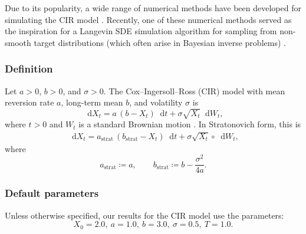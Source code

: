 \documentclass[11pt, letterpaper]{article}
\theoremstyle{definition}
\theoremstyle{remark}
\newcommand{\diff}{\mathop{}\!\mathrm{d}}
\begin{document}
\begin{appendices}
Due to its popularity, a wide range of numerical methods have been developed for simulating the CIR model \cite{alfonsi2005cir, alfonsi2010cir, alfonsi2013cir, cozma2020cir, dereich2011cir, foster2024highSIAM, hefter2019cir, kelly2022cir, lord2010truncation, milstein2015cir, ninomiyavictoir2008}.
Recently, one of these numerical methods \cite{dereich2011cir} served as the inspiration for a Langevin SDE simulation algorithm for sampling from non-smooth target distributions (which often arise in Bayesian inverse problems) \cite{cheltsov2025sampling}.

\subsubsection*{Definition}
Let $a > 0$, $b > 0$, and $\sigma > 0$. The Cox--Ingersoll--Ross (CIR) model with mean reversion rate $a$, long-term mean $b$, and volatility $\sigma$ is
\begin{equation}\label{eq:cir_ito}
    \diff X_t = a\,(b - X_t) \diff t + \sigma \sqrt{X_t} \diff W_t,
\end{equation}
where $t >0$ and $W_t$ is a standard Brownian motion \cite{cox1985cir}.
In Stratonovich form, this is
\begin{align}\label{eq:cir_strat}
\diff X_t = a_\text{strat}\,(b_\text{strat} - X_t) \diff t + \sigma\sqrt{X_{t}} \circ \diff W_t,
\end{align}
where
\begin{equation*}
    a_{\text{strat}} \coloneqq a,\qquad
    b_{\text{strat}} \coloneqq b - \frac{\sigma^2}{4a}.
\end{equation*}

\subsubsection*{Default parameters}
Unless otherwise specified, our results for the CIR model use the parameters:
\[X_{0}=2.0,\ a=1.0,\ b=3.0,\ \sigma=0.5, \ T = 1.0.\]


\end{appendices}
\end{document}
